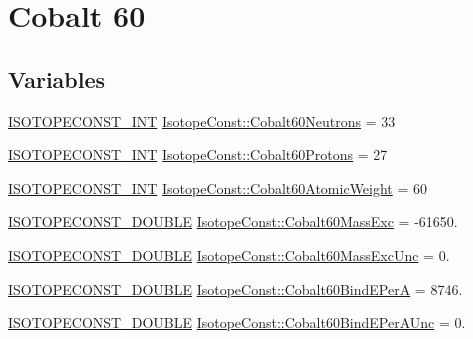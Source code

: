 \hypertarget{group___isotope_const-_cobalt-_co60}{}\section{Cobalt 60}
\label{group___isotope_const-_cobalt-_co60}
\subsection*{Variables}
\begin{DoxyCompactItemize}
\item 
\mbox{\hyperlink{group___isotope_const-_macros_ga5f18360b3e99483a35c32d789e62621c}{I\+S\+O\+T\+O\+P\+E\+C\+O\+N\+S\+T\+\_\+\+I\+NT}} \mbox{\hyperlink{group___isotope_const-_cobalt-_co60_ga7f7dd62f61facd0ff97edea4f298204f}{Isotope\+Const\+::\+Cobalt60\+Neutrons}} = 33
\item 
\mbox{\hyperlink{group___isotope_const-_macros_ga5f18360b3e99483a35c32d789e62621c}{I\+S\+O\+T\+O\+P\+E\+C\+O\+N\+S\+T\+\_\+\+I\+NT}} \mbox{\hyperlink{group___isotope_const-_cobalt-_co60_gac234df716a120e826b8362b0962b32f9}{Isotope\+Const\+::\+Cobalt60\+Protons}} = 27
\item 
\mbox{\hyperlink{group___isotope_const-_macros_ga5f18360b3e99483a35c32d789e62621c}{I\+S\+O\+T\+O\+P\+E\+C\+O\+N\+S\+T\+\_\+\+I\+NT}} \mbox{\hyperlink{group___isotope_const-_cobalt-_co60_gacf2b35937d490241422d0d07f051a510}{Isotope\+Const\+::\+Cobalt60\+Atomic\+Weight}} = 60
\item 
\mbox{\hyperlink{group___isotope_const-_macros_ga8f45a7272ce02c0b4c65c44636ed719a}{I\+S\+O\+T\+O\+P\+E\+C\+O\+N\+S\+T\+\_\+\+D\+O\+U\+B\+LE}} \mbox{\hyperlink{group___isotope_const-_cobalt-_co60_ga7a0da0914106ad30627df699b24654e4}{Isotope\+Const\+::\+Cobalt60\+Mass\+Exc}} = -\/61650.
\item 
\mbox{\hyperlink{group___isotope_const-_macros_ga8f45a7272ce02c0b4c65c44636ed719a}{I\+S\+O\+T\+O\+P\+E\+C\+O\+N\+S\+T\+\_\+\+D\+O\+U\+B\+LE}} \mbox{\hyperlink{group___isotope_const-_cobalt-_co60_gae9c7544fdba174f3b1fa014314274875}{Isotope\+Const\+::\+Cobalt60\+Mass\+Exc\+Unc}} = 0.
\item 
\mbox{\hyperlink{group___isotope_const-_macros_ga8f45a7272ce02c0b4c65c44636ed719a}{I\+S\+O\+T\+O\+P\+E\+C\+O\+N\+S\+T\+\_\+\+D\+O\+U\+B\+LE}} \mbox{\hyperlink{group___isotope_const-_cobalt-_co60_gaf06a37d8d023ec5334230646f74911aa}{Isotope\+Const\+::\+Cobalt60\+Bind\+E\+PerA}} = 8746.
\item 
\mbox{\hyperlink{group___isotope_const-_macros_ga8f45a7272ce02c0b4c65c44636ed719a}{I\+S\+O\+T\+O\+P\+E\+C\+O\+N\+S\+T\+\_\+\+D\+O\+U\+B\+LE}} \mbox{\hyperlink{group___isotope_const-_cobalt-_co60_ga6df423069aacb262ce8a4857c5514fb2}{Isotope\+Const\+::\+Cobalt60\+Bind\+E\+Per\+A\+Unc}} = 0.

\end{DoxyCompactItemize}

